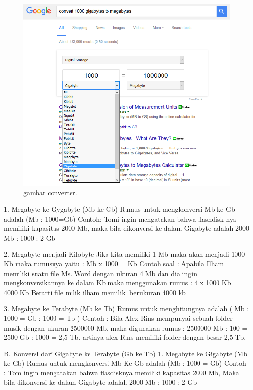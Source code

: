 \begin{figure}[ht]
\centerline{\includegraphics[width=1\textwidth]{figures/converter.PNG}}
\caption{gambar converter.}
\label{converter.png}
\end{figure}

1.	Megabyte ke Gygabyte (Mb ke Gb)
	Rumus untuk mengkonversi Mb ke Gb adalah (Mb : 1000=Gb)
	Contoh: 
	Tomi ingin mengatakan bahwa flashdisk nya memiliki kapasitas 2000 Mb, maka bila dikonversi  ke dalam Gigabyte adalah 2000 Mb : 1000 : 2 Gb 

2.	Megabyte menjadi Kilobyte
Jika kita memiliki 1 Mb maka akan menjadi 1000 Kb maka rumusnya yaitu :
Mb x 1000 = Kb
Contoh soal :
Apabila Ilham memiliki suatu file Ms. Word dengan ukuran 4 Mb dan dia ingin mengkonversikannya ke dalam Kb maka menggunakan rumus :
4 x 1000 Kb = 4000 Kb
Berarti file milik ilham memiliki berukuran 4000 kb

3.	Megabyte ke Terabyte (Mb ke Tb)
Rumus untuk menghitungnya adalah ( Mb : 1000 = Gb : 1000 = Tb )
Contoh :
Bila Alex Rins mempunyai sebuah folder musik dengan ukuran 2500000 Mb, maka digunakan rumus : 2500000 Mb : 100 = 2500 Gb : 1000 = 2,5 Tb.
artinya alex Rins memiliki folder dengan besar 2,5 Tb.

B.	Konversi dari Gigabyte ke Terabyte (Gb ke Tb)
1.	Megabyte ke Gigabyte (Mb ke Gb)
Rumus untuk mengkonversi Mb Ke Gb adalah (Mb : 1000 = Gb)
Contoh :
Tom ingin mengatakan bahwa flasdisknya memiliki kapasitas 2000 Mb, Maka bila dikonversi ke dalam Gigabyte adalah 2000 Mb : 1000 : 2 Gb

